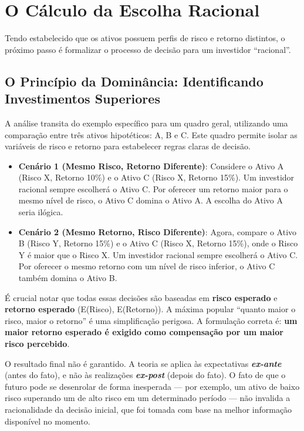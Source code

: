 \documentclass[
  a4paper,
]{book}
\begin{document}
\section{O Cálculo da Escolha
Racional}\label{o-cuxe1lculo-da-escolha-racional}

Tendo estabelecido que os ativos possuem perfis de risco e retorno
distintos, o próximo passo é formalizar o processo de decisão para um
investidor ``racional''.

\subsection{O Princípio da Dominância: Identificando Investimentos
Superiores}\label{o-princuxedpio-da-dominuxe2ncia-identificando-investimentos-superiores}

A análise transita do exemplo específico para um quadro geral,
utilizando uma comparação entre três ativos hipotéticos: A, B e C. Este
quadro permite isolar as variáveis de risco e retorno para estabelecer
regras claras de decisão.

\begin{itemize}
\item
  \textbf{Cenário 1 (Mesmo Risco, Retorno Diferente)}: Considere o Ativo
  A (Risco X, Retorno 10\%) e o Ativo C (Risco X, Retorno 15\%). Um
  investidor racional sempre escolherá o Ativo C. Por oferecer um
  retorno maior para o mesmo nível de risco, o Ativo C domina o Ativo A.
  A escolha do Ativo A seria ilógica.
\item
  \textbf{Cenário 2 (Mesmo Retorno, Risco Diferente)}: Agora, compare o
  Ativo B (Risco Y, Retorno 15\%) e o Ativo C (Risco X, Retorno 15\%),
  onde o Risco Y é maior que o Risco X. Um investidor racional sempre
  escolherá o Ativo C. Por oferecer o mesmo retorno com um nível de
  risco inferior, o Ativo C também domina o Ativo B.
\end{itemize}

É crucial notar que todas essas decisões são baseadas em \textbf{risco
esperado} e \textbf{retorno esperado} (E(Risco), E(Retorno)). A máxima
popular ``quanto maior o risco, maior o retorno'' é uma simplificação
perigosa. A formulação correta é: \textbf{um maior retorno esperado é
exigido como compensação por um maior risco percebido}.

O resultado final não é garantido. A teoria se aplica às expectativas
\textbf{\emph{ex-ante}} (antes do fato), e não às realizações
\textbf{\emph{ex-post}} (depois do fato). O fato de que o futuro pode se
desenrolar de forma inesperada --- por exemplo, um ativo de baixo risco
superando um de alto risco em um determinado período --- não invalida a
racionalidade da decisão inicial, que foi tomada com base na melhor
informação disponível no momento.
\end{document}
